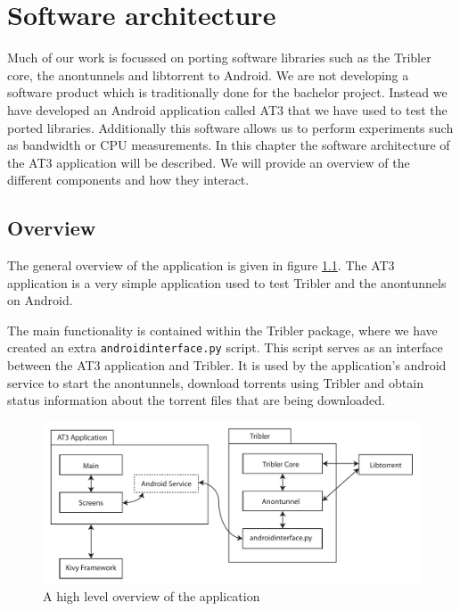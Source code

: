 \chapter{Software architecture}
Much of our work is focussed on porting software libraries such as the Tribler core, the anontunnels and libtorrent to Android. We are not developing a software product which is traditionally done for the bachelor project. Instead we have developed an Android application called AT3 that we have used to test the ported libraries. Additionally this software allows us to perform experiments such as bandwidth or CPU measurements.
In this chapter the software architecture of the AT3 application will be described. We will provide an overview of the different components and how they interact.

\section{Overview}
The general overview of the application is given in figure \ref{fig:overview}. The AT3 application is a very simple application used to test Tribler and the anontunnels on Android.

The main functionality is contained within the Tribler package, where we have created an extra \texttt{androidinterface.py} script. This script serves as an interface between the AT3 application and Tribler. It is used by the application's android service to start the anontunnels, download torrents using Tribler and obtain status information about the torrent files that are being downloaded. 

\begin{figure}[h]
	\centering
	\includegraphics[width=\textwidth]{graphics/overview.pdf}
	\caption{A high level overview of the application}
	\label{fig:overview}
\end{figure}

